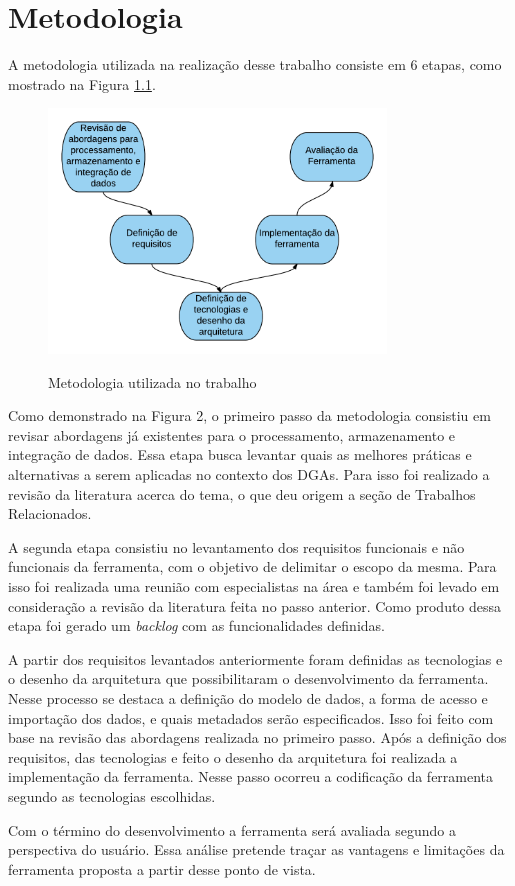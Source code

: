 
\chapter{Metodologia}
\label{chap:metodologia}

A metodologia utilizada na realização desse trabalho consiste em 6 etapas, 
como mostrado na Figura \ref{fig:metodologia}.

\begin{figure}[!htb]
    \centering
    \caption{Metodologia utilizada no trabalho}
    \includegraphics[width=0.8\textwidth]{./04-figuras/metodologia}
    \label{fig:metodologia}
\end{figure}


Como demonstrado na Figura 2, o primeiro passo da metodologia consistiu em revisar abordagens 
já existentes para o processamento, armazenamento e integração de dados. Essa etapa busca 
levantar quais as melhores práticas e alternativas a serem aplicadas no contexto dos DGAs. 
Para isso foi realizado a revisão da literatura acerca do tema, o que deu origem a seção de 
Trabalhos Relacionados.

A segunda etapa consistiu no levantamento dos requisitos funcionais e não funcionais da 
ferramenta, com o objetivo de delimitar o escopo da mesma. Para isso foi realizada uma reunião
com especialistas na área e também foi levado em consideração a revisão da literatura 
feita no passo anterior. Como produto dessa etapa foi gerado um \textit{backlog} com as 
funcionalidades definidas.

A partir dos requisitos levantados anteriormente foram definidas as tecnologias e o desenho 
da arquitetura que possibilitaram o desenvolvimento da ferramenta. Nesse processo se destaca 
a definição do modelo de dados, a forma de acesso e importação dos dados, e quais metadados
serão especificados. Isso foi feito com base na revisão das abordagens realizada no primeiro
passo. Após a definição dos requisitos, das tecnologias e feito o desenho da arquitetura 
foi realizada a implementação da ferramenta. Nesse passo ocorreu a codificação da ferramenta
segundo as tecnologias escolhidas. 

Com o término do desenvolvimento a ferramenta será avaliada segundo a perspectiva do usuário. 
Essa análise pretende traçar as vantagens e limitações da ferramenta proposta a partir desse 
ponto de vista.
